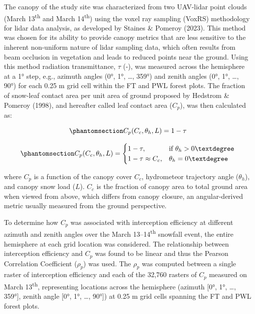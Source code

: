 \documentclass[
  letterpaper,
  DIV=11,
  numbers=noendperiod]{scrartcl}
\begin{document}
The canopy of the study site was characterized from two UAV-lidar point
clouds (March 13\textsuperscript{th} and March 14\textsuperscript{th})
using the voxel ray sampling (VoxRS) methodology for lidar data
analysis, as developed by Staines \& Pomeroy (2023). This method was
chosen for its ability to provide canopy metrics that are less sensitive
to the inherent non-uniform nature of lidar sampling data, which often
results from beam occlusion in vegetation and leads to reduced points
near the ground. Using this method radiation transmittance, \(\tau\)
(-), was measured across the hemisphere at a 1° step, e.g., azimuth
angles (0°, 1°, \ldots, 359°) and zenith angles (0°, 1°, \ldots, 90°)
for each 0.25 m grid cell within the FT and PWL forest plots. The
fraction of snow-leaf contact area per unit area of ground proposed by
Hedstrom \& Pomeroy (1998), and hereafter called leaf contact area
(\(C_p\)), was then calculated as:

\begin{equation}\phantomsection\label{eq-lca}{
C_p(C_c, \theta_h, L) = 1-\tau
}\end{equation}

\begin{equation}\phantomsection\label{eq-tf-ode}{
C_p(C_c, \theta_h, L) = \begin{cases}
    1-\tau,& \text{if } \theta_h> 0°\\
    1-\tau \approx C_c ,              & \theta_h= 0°
\end{cases}
}\end{equation}

where \(C_p\) is a function of the canopy cover \(C_c\), hydrometeor
trajectory angle (\(\theta_h\)), and canopy snow load (\(L\)). \(C_c\)
is the fraction of canopy area to total ground area when viewed from
above, which differs from canopy closure, an angular-derived metric
usually measured from the ground perspective.

To determine how \(C_p\) was associated with interception efficiency at
different azimuth and zenith angles over the March
13--14\textsuperscript{th} snowfall event, the entire hemisphere at each
grid location was considered. The relationship between interception
efficiency and \(C_p\) was found to be linear and thus the Pearson
Correlation Coefficient (\(\rho_p\)) was used. The \(\rho_p\) was
computed between a single raster of interception efficiency and each of
the 32,760 rasters of \(C_p\) measured on March 13\textsuperscript{th},
representing locations across the hemisphere (azimuth {[}0°, 1°, \ldots,
359°{]}, zenith angle {[}0°, 1°, \ldots, 90°{]}) at 0.25 m grid cells
spanning the FT and PWL forest plots.
\end{document}
